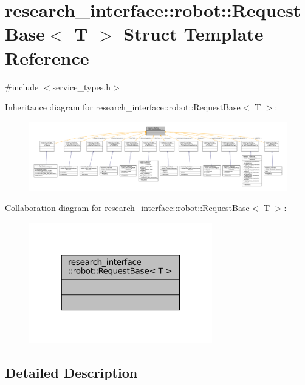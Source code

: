 \hypertarget{structresearch__interface_1_1robot_1_1RequestBase}{}\section{research\+\_\+interface\+:\+:robot\+:\+:Request\+Base$<$ T $>$ Struct Template Reference}
\label{structresearch__interface_1_1robot_1_1RequestBase}


{\ttfamily \#include $<$service\+\_\+types.\+h$>$}



Inheritance diagram for research\+\_\+interface\+:\+:robot\+:\+:Request\+Base$<$ T $>$\+:
\nopagebreak
\begin{figure}[H]
\begin{center}
\leavevmode
\includegraphics[width=350pt]{structresearch__interface_1_1robot_1_1RequestBase__inherit__graph}
\end{center}
\end{figure}


Collaboration diagram for research\+\_\+interface\+:\+:robot\+:\+:Request\+Base$<$ T $>$\+:
\nopagebreak
\begin{figure}[H]
\begin{center}
\leavevmode
\includegraphics[width=226pt]{structresearch__interface_1_1robot_1_1RequestBase__coll__graph}
\end{center}
\end{figure}


\subsection{Detailed Description}
